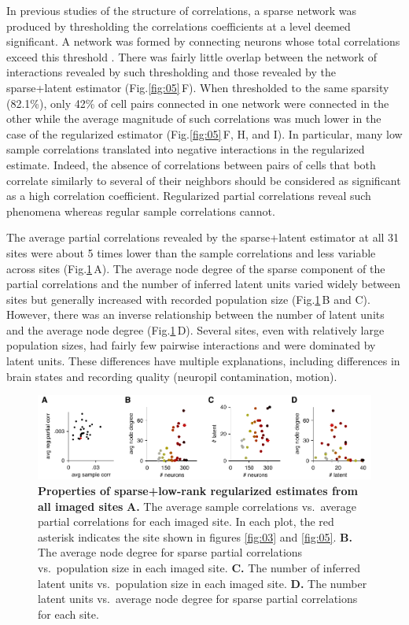 \documentclass[10pt]{article}
\newcommand{\figref}[2]{Fig.\;\ref{fig:#1}\,#2}
\begin{document}
In previous studies of the structure of correlations, a sparse network was produced by thresholding the correlations coefficients at a level deemed significant. A network was formed by connecting neurons whose total correlations exceed this threshold \cite{Golshani:2009,Malmersjo:2013}. There was fairly little overlap between the network of interactions revealed by such thresholding and those revealed by the sparse+latent estimator (\figref{05}{F}). When thresholded to the same sparsity (82.1\%), only 42\% of cell pairs connected in one network were connected in the other while the average magnitude of such correlations was much lower in the case of the regularized estimator (\figref{05}{F, H, and I}). In particular, many low sample correlations translated into negative interactions in the regularized estimate. Indeed, the absence of correlations between pairs of cells that both correlate similarly to several of their neighbors should be considered as significant as a high correlation coefficient. Regularized partial correlations reveal such phenomena whereas regular sample correlations cannot.

The average partial correlations revealed by the sparse+latent estimator at all 31 sites were about 5 times lower than the sample correlations and  less variable across sites (\figref{06}{A}). The average node degree of the sparse component of the partial correlations and the number of inferred latent units varied widely between sites but generally increased with recorded population size (\figref{06}{B and C}). However, there was an inverse relationship between the number of latent units and the average node degree (\figref{06}{D}). Several sites, even with relatively large population sizes, had fairly few pairwise interactions and were dominated by latent units.  These differences have multiple explanations, including differences in brain states and recording quality (neuropil contamination, motion). 

\begin{figure}[!ht]
    \begin{center}
        \includegraphics{./figures/Figure06.pdf}
    \end{center}
    \caption{{\bf Properties of sparse+low-rank regularized estimates from all imaged sites}
    {\bf A.} The average sample correlations vs.~average partial correlations for each imaged site. In each plot, the red asterisk indicates the site shown in figures \ref{fig:03} and \ref{fig:05}.
    {\bf B.} The average node degree for sparse partial correlations vs.~population size in each imaged site. 
    {\bf C.} The number of inferred latent units vs.~population size in each imaged site.
    {\bf D.} The number latent units vs.~average node degree for sparse partial correlations for each site.
}
\label{fig:06}
\end{figure}
\end{document}
